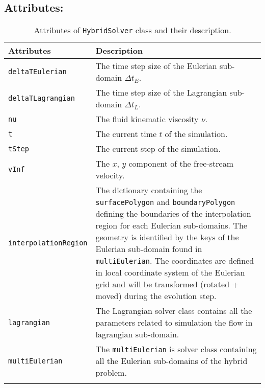 \subsection*{Attributes:}
\begingroup
\footnotesize
\begin{longtable}{|l|p{12cm}|}
	\hline
	\textbf{Attributes} & \textbf{Description}\\
	\toprule
    \texttt{deltaTEulerian} 		& The time step size of the Eulerian sub-domain $\Delta t_E$. \\ \hline
    \texttt{deltaTLagrangian} 		& The time step size of the Lagrangian sub-domain $\Delta t_L$.\\ \hline
	\texttt{nu} 			& The fluid kinematic viscosity $\nu$.  \\ \hline        
    \texttt{t} 				& The current time $t$ of the simulation. \\ \hline                    
    \texttt{tStep} 			& The current step of the simulation. \\ \hline                    
    \texttt{vInf} 			& The $x$, $y$ component of the free-stream velocity. \\ \hline
    \texttt{interpolationRegion} & The dictionary containing the \texttt{surfacePolygon} and \texttt{boundaryPolygon} defining the boundaries of the interpolation region for each Eulerian sub-domains. The geometry is identified by the keys of the Eulerian sub-domain found in \texttt{multiEulerian}. The coordinates are defined in local coordinate system of the Eulerian grid and will be transformed (rotated + moved) during the evolution step. \\ \hline
    \texttt{lagrangian} 	& The Lagrangian solver class contains all the parameters related to simulation the flow in lagrangian sub-domain. \\ \hline
    \texttt{multiEulerian} 	& The \texttt{multiEulerian} is solver class containing all the Eulerian sub-domains of the hybrid problem. \\ \hline
    
    \caption{Attributes of \texttt{HybridSolver} class and their description.}
    \label{tab:attributeHybrid}
\end{longtable}
\endgroup



